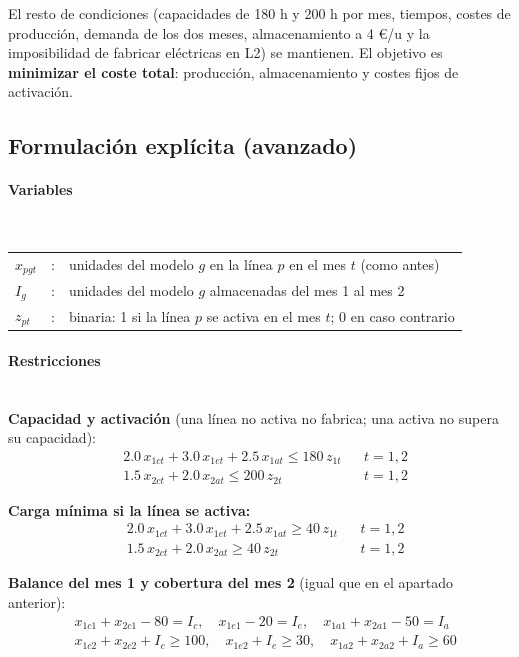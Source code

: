 El resto de condiciones (capacidades de 180 h y 200 h por mes, tiempos, costes de producción, demanda de los dos meses, almacenamiento a 4 €/u y la imposibilidad de fabricar eléctricas en L2) se mantienen. El objetivo es \textbf{minimizar el coste total}: producción, almacenamiento y costes fijos de activación.

\subsection{Formulación explícita (avanzado)}

\paragraph{Variables}\mbox{}\\
\begin{tabular}{l c l}
    $x_{pgt}$ & : & unidades del modelo $g$ en la línea $p$ en el mes $t$ (como antes) \\
    $I_g$        & : & unidades del modelo $g$ almacenadas del mes 1 al mes 2 \\
    $z_{pt}$    & : & binaria: 1 si la línea $p$ se activa en el mes $t$; 0 en caso contrario \\
\end{tabular}

\paragraph{Restricciones}\mbox{}\\
\textbf{Capacidad y activación} (una línea no activa no fabrica; una activa no supera su capacidad):
\begin{align}
    & 2.0\,x_{1ct} + 3.0\,x_{1et} + 2.5\,x_{1at} \leq 180\,z_{1t} && t=1,2\\
    & 1.5\,x_{2ct} + 2.0\,x_{2at} \leq 200\,z_{2t} && t=1,2
\end{align}

\textbf{Carga mínima si la línea se activa:}
\begin{align}
    & 2.0\,x_{1ct} + 3.0\,x_{1et} + 2.5\,x_{1at} \geq 40\,z_{1t} && t=1,2\\
    & 1.5\,x_{2ct} + 2.0\,x_{2at} \geq 40\,z_{2t} && t=1,2
\end{align}

\textbf{Balance del mes 1 y cobertura del mes 2} (igual que en el apartado anterior):
\begin{align}
    & x_{1c1} + x_{2c1} - 80 = I_c,\quad x_{1e1} - 20 = I_e,\quad x_{1a1} + x_{2a1} - 50 = I_a \\
    & x_{1c2} + x_{2c2} + I_c \geq 100,\quad x_{1e2} + I_e \geq 30,\quad x_{1a2} + x_{2a2} + I_a \geq 60
\end{align}

